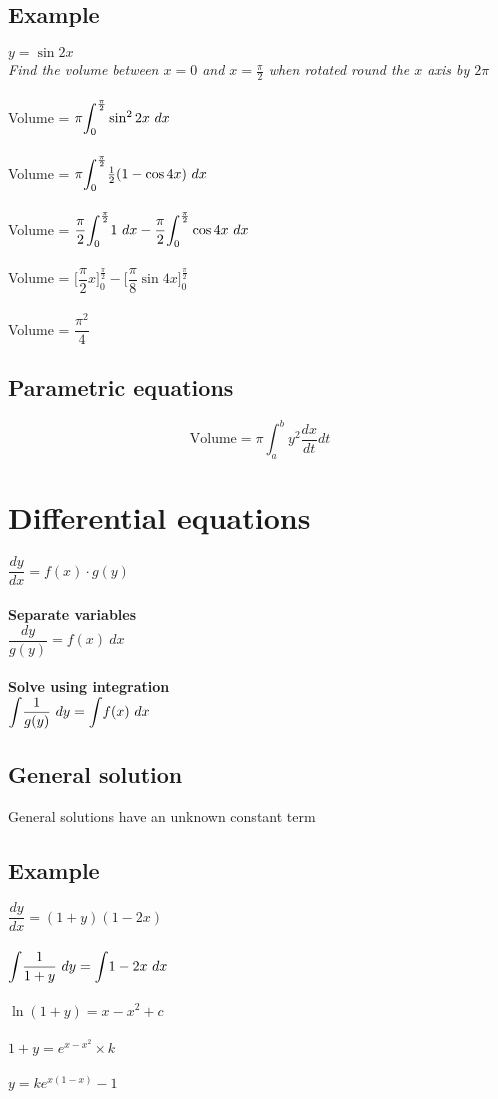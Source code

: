\documentclass{article}[18pt]
\begin{document}
\subsection{Example}
$y=\sin2x$\\
\textit{Find the volume between $x=0$ and $x=\frac{\pi}{2}$ when rotated round the $x$ axis by $2\pi$}\\
\\
Volume = $\pi\mathlarger{\int_0^\frac{\pi}{2}}\sin^22x \ dx$\\
\\
Volume = $\pi\mathlarger{\int_0^\frac{\pi}{2}}\frac{1}{2}(1-\cos4x) \ dx$\\
\\
Volume = $\dfrac{\pi}{2}\mathlarger{\int_0^\frac{\pi}{2}}1 \ dx - \dfrac{\pi}{2}\mathlarger{\int_0^\frac{\pi}{2}}\cos4x \ dx$\\
\\
Volume = $\Big[\dfrac{\pi}{2}x\Big]^\frac{\pi}{2}_0-\Big[\dfrac{\pi}{8}\sin4x\Big]^\frac{\pi}{2}_0$\\
\\
Volume = $\dfrac{\pi^2}{4}$
\newpage
\subsection{Parametric equations}
$$\textrm{Volume}=\pi\int^b_a y^2 \frac{dx}{dt} dt$$
\section{Differential equations}
$\dfrac{dy}{dx}=f(x)\cdot g(y)$\\
\\
\textbf{Separate variables}\\
$\dfrac{dy}{g(y)}=f(x) \ dx$\\
\\
\textbf{Solve using integration}\\
$\mathlarger{\int}\dfrac{1}{g(y)} \ dy=\mathlarger{\int}f(x) \ dx$
\subsection{General solution}
General solutions have an unknown constant term
\subsection{Example}
$\dfrac{dy}{dx}=(1+y)(1-2x)$\\
\\
$\mathlarger{\int}\dfrac{1}{1+y} \ dy = \mathlarger{\int}1-2x \ dx$\\
\\
$\ln(1+y)=x-x^2+c$\\
\\
$1+y=e^{x-x^2}\times k$\\
\\
$y=ke^{x(1-x)}-1$
\end{document}
